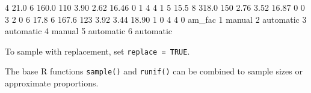 \documentclass[
]{book}
\newenvironment{Shaded}{\begin{snugshade}}{\end{snugshade}}
\newcommand{\DecValTok}[1]{\textcolor[rgb]{0.00,0.00,0.81}{#1}}
\newcommand{\FloatTok}[1]{\textcolor[rgb]{0.00,0.00,0.81}{#1}}
\newcommand{\NormalTok}[1]{#1}
\begin{document}
\begin{Shaded}
\begin{Highlighting}[]
\DecValTok{4} \FloatTok{21.0}         \DecValTok{6} \FloatTok{160.0} \DecValTok{110}       \FloatTok{3.90}   \FloatTok{2.62} \FloatTok{16.46}      \DecValTok{0}  \DecValTok{1}    \DecValTok{4}    \DecValTok{4}     \DecValTok{1}
\DecValTok{5} \FloatTok{15.5}         \DecValTok{8} \FloatTok{318.0} \DecValTok{150}       \FloatTok{2.76}   \FloatTok{3.52} \FloatTok{16.87}      \DecValTok{0}  \DecValTok{0}    \DecValTok{3}    \DecValTok{2}     \DecValTok{0}
\DecValTok{6} \FloatTok{17.8}         \DecValTok{6} \FloatTok{167.6} \DecValTok{123}       \FloatTok{3.92}   \FloatTok{3.44} \FloatTok{18.90}      \DecValTok{1}  \DecValTok{0}    \DecValTok{4}    \DecValTok{4}     \DecValTok{0}
\NormalTok{     am\_fac}
\DecValTok{1}\NormalTok{    manual}
\DecValTok{2}\NormalTok{ automatic}
\DecValTok{3}\NormalTok{ automatic}
\DecValTok{4}\NormalTok{    manual}
\DecValTok{5}\NormalTok{ automatic}
\DecValTok{6}\NormalTok{ automatic}
\end{Highlighting}
\end{Shaded}

To sample with replacement, set \texttt{replace\ =\ TRUE}.

The base R functions \texttt{sample()} and \texttt{runif()} can be combined to sample sizes or approximate proportions.
\end{document}
